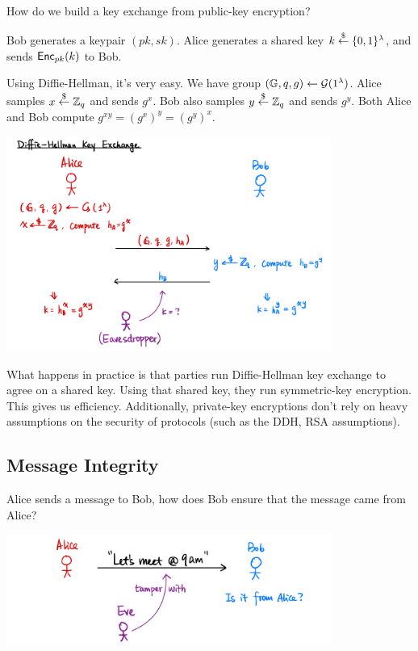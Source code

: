 \begin{ques*}
    How do we build a key exchange from public-key encryption?
\end{ques*}
Bob generates a keypair $(pk, sk)$. Alice generates a shared key $k\overset{\$}{\leftarrow} \{0, 1\}^\lambda$, and sends $\operatorname{\mathsf{Enc}}_{pk}(k)$ to Bob.

Using Diffie-Hellman, it's very easy. We have group $(\mathbb G, q, g)\leftarrow \mathcal{G}(1^\lambda)$. Alice samples $x\overset{\$}{\leftarrow} \mathbb Z_q$ and sends $g^x$. Bob also samples $y\overset{\$}{\leftarrow} \mathbb Z_q$ and sends $g^y$. Both Alice and Bob compute $g^{xy} = (g^x)^y = (g^y)^x$.

\begin{center}
    \includegraphics[width=0.8\textwidth]{images/2023-02-02/diffie-hellman.png}
\end{center}

What happens in practice is that parties run Diffie-Hellman key exchange to agree on a shared key. Using that shared key, they run symmetric-key encryption. This gives us efficiency. Additionally, private-key encryptions don't rely on heavy assumptions on the security of protocols (such as the DDH, RSA assumptions).

\subsection{Message Integrity}
Alice sends a message to Bob, how does Bob ensure that the message came from Alice?

\begin{center}
    \includegraphics[width=0.8\textwidth]{images/2023-02-02/integrity.png}
\end{center}

